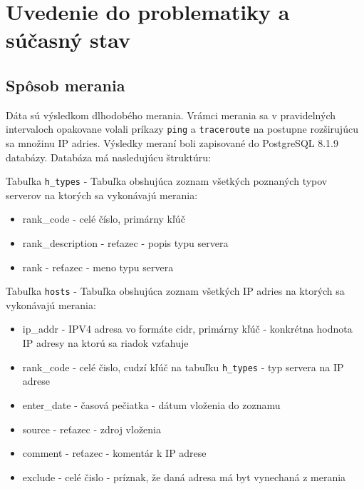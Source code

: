 \chapter{Uvedenie do problematiky a súčasný stav}

\label{kap:uvod_teoria}

\section{Spôsob merania}
Dáta sú výsledkom dlhodobého merania. Vrámci merania sa v pravidelných intervaloch opakovane volali príkazy \lstinline{ping} a \lstinline{traceroute} na postupne 
rozširujúcu sa množinu IP adries. Výsledky meraní boli zapisované do PostgreSQL 8.1.9 databázy. Databáza má nasledujúcu štruktúru:

Tabuľka \lstinline{h_types} - Tabuľka obshujúca zoznam všetkých poznaných typov serverov na ktorých sa vykonávajú merania:
\begin{itemize}
    \item rank\_code - celé číslo, primárny kľúč
    \item rank\_description - reťazec - popis typu servera
    \item rank - reťazec - meno typu servera
\end{itemize}

Tabuľka \lstinline{hosts} - Tabuľka obshujúca zoznam všetkých IP adries na ktorých sa vykonávajú merania:
\begin{itemize}
    \item ip\_addr - IPV4 adresa vo formáte cidr, primárny kľúč - konkrétna hodnota IP adresy na ktorú sa riadok vzťahuje
    \item rank\_code - celé čislo, cudzí kľúč na tabuľku \lstinline{h_types} - typ servera na IP adrese
    \item enter\_date - časová pečiatka - dátum vloženia do zoznamu 
    \item source - reťazec - zdroj vloženia 
    \item comment - reťazec - komentár k IP adrese
    \item exclude - celé čislo - príznak, že daná adresa má byt vynechaná z merania
\end{itemize}

